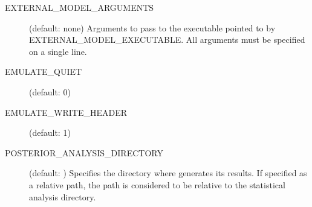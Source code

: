 \begin{description}
    \item[EXTERNAL\_MODEL\_ARGUMENTS] (default: none) Arguments to pass to the executable pointed to by EXTERNAL\_MODEL\_EXECUTABLE. All arguments must be specified on a single line.

    \item[EMULATE\_QUIET] (default: 0)

    \item[EMULATE\_WRITE\_HEADER] (default: 1)

    \item[POSTERIOR\_ANALYSIS\_DIRECTORY] (default: ) Specifies the directory where  generates its results. If specified as a relative path, the path is considered to be relative to the statistical analysis directory.
\end{description}

